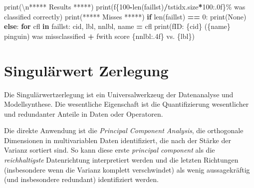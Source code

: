 \documentclass[
]{book}
\newenvironment{Shaded}{\begin{snugshade}}{\end{snugshade}}
\newcommand{\BuiltInTok}[1]{#1}
\newcommand{\CharTok}[1]{\textcolor[rgb]{0.31,0.60,0.02}{#1}}
\newcommand{\ControlFlowTok}[1]{\textcolor[rgb]{0.13,0.29,0.53}{\textbf{#1}}}
\newcommand{\DecValTok}[1]{\textcolor[rgb]{0.00,0.00,0.81}{#1}}
\newcommand{\KeywordTok}[1]{\textcolor[rgb]{0.13,0.29,0.53}{\textbf{#1}}}
\newcommand{\NormalTok}[1]{#1}
\newcommand{\OperatorTok}[1]{\textcolor[rgb]{0.81,0.36,0.00}{\textbf{#1}}}
\newcommand{\SpecialCharTok}[1]{\textcolor[rgb]{0.00,0.00,0.00}{#1}}
\newcommand{\SpecialStringTok}[1]{\textcolor[rgb]{0.31,0.60,0.02}{#1}}
\newcommand{\StringTok}[1]{\textcolor[rgb]{0.31,0.60,0.02}{#1}}
\theoremstyle{definition}
\theoremstyle{definition}
\theoremstyle{definition}
\theoremstyle{definition}
\theoremstyle{remark}
\begin{document}
\begin{Shaded}
\begin{Highlighting}[]
\BuiltInTok{print}\NormalTok{(}\StringTok{\textquotesingle{}}\CharTok{\textbackslash{}n}\StringTok{***** Results *****\textquotesingle{}}\NormalTok{)}
\BuiltInTok{print}\NormalTok{(}\SpecialStringTok{f\textquotesingle{}}\SpecialCharTok{\{}\DecValTok{100}\OperatorTok{{-}}\BuiltInTok{len}\NormalTok{(faillst)}\OperatorTok{/}\NormalTok{tstidx}\SpecialCharTok{.}\NormalTok{size}\OperatorTok{*}\DecValTok{100}\SpecialCharTok{:.0f\}}\SpecialStringTok{\% was classified correctly\textquotesingle{}}\NormalTok{)}
\BuiltInTok{print}\NormalTok{(}\StringTok{\textquotesingle{}***** Misses *****\textquotesingle{}}\NormalTok{)}
\ControlFlowTok{if} \BuiltInTok{len}\NormalTok{(faillst) }\OperatorTok{==} \DecValTok{0}\NormalTok{:}
    \BuiltInTok{print}\NormalTok{(}\StringTok{\textquotesingle{}None\textquotesingle{}}\NormalTok{)}
\ControlFlowTok{else}\NormalTok{:}
    \ControlFlowTok{for}\NormalTok{ cfl }\KeywordTok{in}\NormalTok{ faillst:}
\NormalTok{        cid, lbl, nnlbl, name }\OperatorTok{=}\NormalTok{ cfl}
        \BuiltInTok{print}\NormalTok{(}\SpecialStringTok{f\textquotesingle{}ID: }\SpecialCharTok{\{}\NormalTok{cid}\SpecialCharTok{\}}\SpecialStringTok{ (}\SpecialCharTok{\{}\NormalTok{name}\SpecialCharTok{\}}\SpecialStringTok{ pinguin) was missclassified \textquotesingle{}} \OperatorTok{+}
              \SpecialStringTok{f\textquotesingle{}with score }\SpecialCharTok{\{}\NormalTok{nnlbl}\SpecialCharTok{:.4f\}}\SpecialStringTok{ vs. }\SpecialCharTok{\{}\NormalTok{lbl}\SpecialCharTok{\}}\SpecialStringTok{\textquotesingle{}}\NormalTok{)}
\end{Highlighting}
\end{Shaded}

\hypertarget{singuluxe4rwert-zerlegung}{%
\chapter{Singulärwert Zerlegung}\label{singuluxe4rwert-zerlegung}}

Die Singulärwertzerlegung ist ein Universalwerkzeug der Datenanalyse und
Modellsynthese.
Die wesentliche Eigenschaft ist die Quantifizierung
wesentlicher und redundanter Anteile in Daten oder Operatoren.

Die direkte Anwendung ist die \emph{Principal Component Analysis}, die orthogonale Dimensionen in multivariablen Daten identifiziert, die nach der Stärke der Varianz sortiert sind. So kann diese erste \emph{principal component} als die \emph{reichhaltigste} Datenrichtung interpretiert werden und die letzten Richtungen (insbesondere wenn die Varianz komplett verschwindet) als wenig aussagekräftig (und insbesondere redundant) identifiziert werden.
\end{document}
